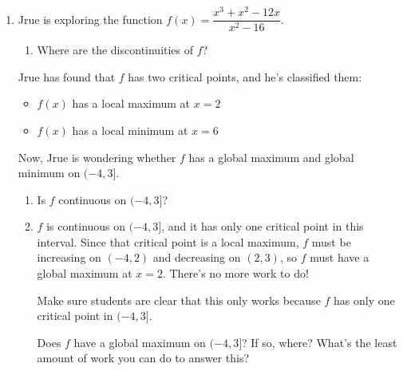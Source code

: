 \documentclass{article}
\begin{document}
\begin{enumerate}
\begin{enumerate}[resume]
    \begin{problem}[\vfill\newpage]
      State the Extreme Value Theorem. Are your answers consistent with it? 
    \end{problem}

  \end{enumerate}

\item  \label{fall2023-workshop6-2}

  Jrue is exploring the function $f(x) = \dfrac{x^3 + x^2 - 12 x}{x^2 - 16}$.
  \begin{enumerate}
  \item
    \begin{problem}[1in]
      Where are the discontinuities of $f$? 
    \end{problem}

  \end{enumerate}
  Jrue has found that $f$ has two critical points, and he's classified them:
  \begin{itemize}[nosep]
  \item $f(x)$ has a local maximum at $x = 2$
  \item $f(x)$ has a local minimum at $x = 6$
  \end{itemize}
  Now, Jrue is wondering whether $f$ has a global maximum and global minimum on $(-4, 3]$.
  \begin{enumerate}[resume]

  \item
    \begin{problem}[0.75in]
      Is $f$ continuous on $(-4, 3]$? 
    \end{problem}

  \item

    \begin{workshop}
      $f$ is continuous on $(-4, 3]$, and it has only one critical point in this interval. Since that critical point is a local maximum, $f$ must be increasing on $(-4, 2)$ and decreasing on $(2, 3)$, so $f$ must have a global maximum at $x = 2$. There's no more work to do!

      Make sure students are clear that this only works because $f$ has only one critical point in $(-4, 3]$. 
    \end{workshop}

    \begin{problem}[\vfill]
      Does $f$ have a global maximum on $(-4, 3]$? If so, where? What's the least amount of work you can do to answer this? 
    \end{problem}    


\end{enumerate}
\end{enumerate}
\end{document}

